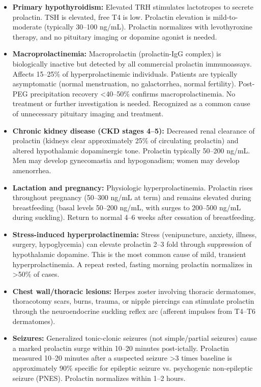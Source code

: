 \begin{itemize}
  \item \textbf{Primary hypothyroidism:} Elevated TRH stimulates lactotropes to secrete prolactin. TSH is elevated, free T4 is low. Prolactin elevation is mild-to-moderate (typically 30--100 ng/mL). Prolactin normalizes with levothyroxine therapy, and no pituitary imaging or dopamine agonist is needed.
  \item \textbf{Macroprolactinemia:} Macroprolactin (prolactin-IgG complex) is biologically inactive but detected by all commercial prolactin immunoassays. Affects 15--25\% of hyperprolactinemic individuals. Patients are typically asymptomatic (normal menstruation, no galactorrhea, normal fertility). Post-PEG precipitation recovery <40--50\% confirms macroprolactinemia. No treatment or further investigation is needed. Recognized as a common cause of unnecessary pituitary imaging and treatment.
  \item \textbf{Chronic kidney disease (CKD stages 4--5):} Decreased renal clearance of prolactin (kidneys clear approximately 25\% of circulating prolactin) and altered hypothalamic dopaminergic tone. Prolactin typically 50--200 ng/mL. Men may develop gynecomastia and hypogonadism; women may develop amenorrhea.
  \item \textbf{Lactation and pregnancy:} Physiologic hyperprolactinemia. Prolactin rises throughout pregnancy (50--300 ng/mL at term) and remains elevated during breastfeeding (basal levels 50--200 ng/mL, with surges to 200--500 ng/mL during suckling). Return to normal 4--6 weeks after cessation of breastfeeding.
  \item \textbf{Stress-induced hyperprolactinemia:} Stress (venipuncture, anxiety, illness, surgery, hypoglycemia) can elevate prolactin 2--3 fold through suppression of hypothalamic dopamine. This is the most common cause of mild, transient hyperprolactinemia. A repeat rested, fasting morning prolactin normalizes in >50\% of cases.
  \item \textbf{Chest wall/thoracic lesions:} Herpes zoster involving thoracic dermatomes, thoracotomy scars, burns, trauma, or nipple piercings can stimulate prolactin through the neuroendocrine suckling reflex arc (afferent impulses from T4--T6 dermatomes).
  \item \textbf{Seizures:} Generalized tonic-clonic seizures (not simple/partial seizures) cause a marked prolactin surge within 10--20 minutes post-ictally. Prolactin measured 10--20 minutes after a suspected seizure >3 times baseline is approximately 90\% specific for epileptic seizure vs. psychogenic non-epileptic seizure (PNES). Prolactin normalizes within 1--2 hours.

\end{itemize}

